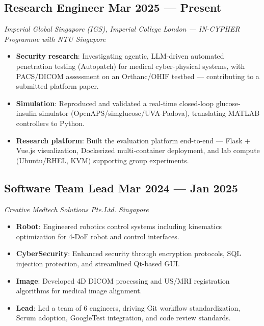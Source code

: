 \documentclass[a4paper,10pt]{article}
\newcommand{\subtextit}[1]{
\vspace{0cm} 
\textit{ #1 
\vspace{-0.1cm}} }
\newenvironment{zitemize}{
\vspace{0.1cm}
\begin{itemize}\itemsep 1.5pt \parskip 2pt \parsep 5pt}
{\end{itemize}\vspace{-0.3cm}}
\begin{document}
\subsection*{\large Research Engineer \hfill Mar 2025 --- Present}
\subtextit{Imperial Global Singapore (IGS), Imperial College London --- IN-CYPHER Programme with NTU \hfill Singapore}
\begin{zitemize}
    \item \textbf{Security research}: Investigating agentic, LLM-driven automated penetration testing (Autopatch) for medical cyber-physical systems, with PACS/DICOM assessment on an Orthanc/OHIF testbed --- contributing to a submitted platform paper.
    \item \textbf{Simulation}: Reproduced and validated a real-time closed-loop glucose-insulin simulator (OpenAPS/simglucose/UVA-Padova), translating MATLAB controllers to Python.
    \item \textbf{Research platform}: Built the evaluation platform end-to-end --- Flask + Vue.js visualization, Dockerized multi-container deployment, and lab compute (Ubuntu/RHEL, KVM) supporting group experiments.
\end{zitemize}

\subsection*{\large Software Team Lead \hfill Mar 2024 --- Jan 2025}
\subtextit{Creative Medtech Solutions Pte.Ltd. \hfill Singapore}
\begin{zitemize}
    \item \textbf{Robot}: Engineered robotics control systems including kinematics optimization for 4-DoF robot and control interfaces.
    \item \textbf{CyberSecurity}: Enhanced security through encryption protocols, SQL injection protection, and streamlined Qt-based GUI.
    \item \textbf{Image}: Developed 4D DICOM processing and US/MRI registration algorithms for medical image alignment.
    \item \textbf{Lead}: Led a team of 6 engineers, driving Git workflow standardization, Scrum adoption, GoogleTest integration, and code review standards.
\end{zitemize}
\end{document}
